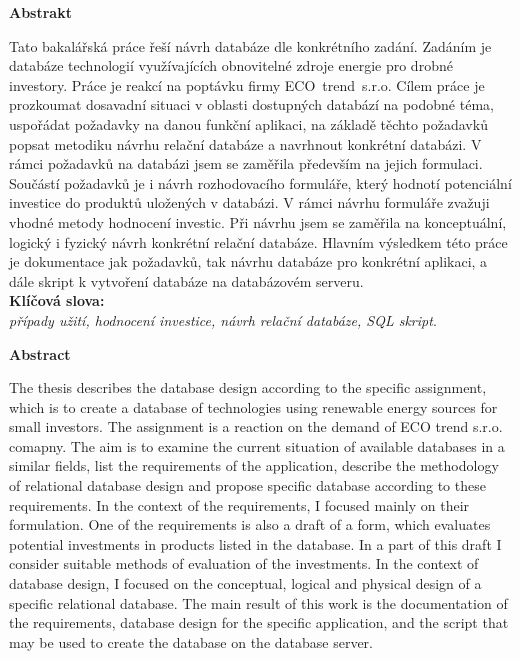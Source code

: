 \documentclass[11pt,a4paper]{article}
\begin{document}
\newpage
\thispagestyle{empty}
\vspace*{5cm}
{\Huge \noindent \textbf{Abstrakt}}
\vspace*{1cm} 

\noindent Tato bakalářská práce řeší návrh databáze dle konkrétního zadání. Zadáním je databáze technologií využívajících obnovitelné zdroje energie pro drobné investory. Práce je reakcí na poptávku firmy ECO~trend~s.r.o. Cílem práce je prozkoumat dosavadní situaci v oblasti dostupných databází na podobné téma, uspořádat požadavky na danou funkční aplikaci, na základě těchto požadavků popsat metodiku návrhu relační databáze a navrhnout konkrétní databázi. V rámci požadavků na databázi jsem se zaměřila především na jejich formulaci. Součástí požadavků je i návrh rozhodovacího formuláře, který hodnotí potenciální investice do produktů uložených v databázi. V rámci návrhu formuláře zvažuji vhodné metody hodnocení investic. Při návrhu jsem se zaměřila na konceptuální, logický i fyzický návrh konkrétní relační databáze. Hlavním výsledkem této práce je dokumentace jak požadavků, tak návrhu databáze pro konkrétní aplikaci, a dále skript k vytvoření databáze na databázovém serveru.\\  

\noindent \textbf{Klíčová slova:}\\
\textit{případy užití, hodnocení investice, návrh relační databáze, SQL skript}.

\vspace{1.5cm}

{\Huge \noindent \textbf{Abstract}}
\vspace*{1cm}

\noindent The thesis describes the database design according to the specific assignment, which is to create a database of technologies using renewable energy sources for small investors. The assignment is a reaction on the demand of ECO trend s.r.o. comapny. The aim is to examine the current situation of available databases in a similar fields, list the requirements of the application, describe the methodology of relational database design and propose specific database according to these requirements. In the context of the requirements, I focused mainly on their formulation. One of the requirements is also a draft of a form, which evaluates potential investments in products listed in the database. In a part of this draft I consider suitable methods of evaluation of the investments. In the context of database design, I focused on the conceptual, logical and physical design of a specific relational database. The main result of this work is the documentation of the requirements, database design for the specific application, and the script that may be used to create the database on the database server. \\
\end{document}
